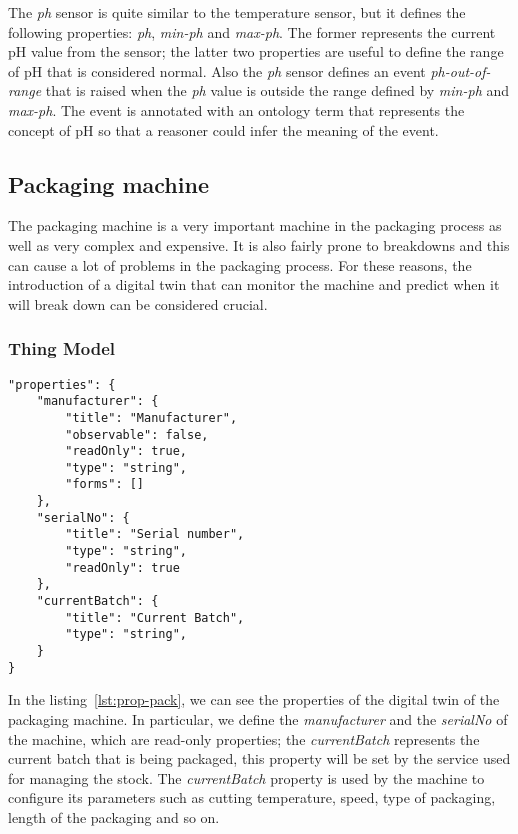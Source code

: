 The \textit{ph} sensor is quite similar to the temperature sensor, but it defines the following properties: \textit{ph}, \textit{min-ph} and \textit{max-ph}. The former represents the current pH value from the sensor; the latter two properties are useful to define the range of pH that is considered normal. Also the \textit{ph} sensor defines an event \textit{ph-out-of-range} that is raised when the \textit{ph} value is outside the range defined by \textit{min-ph} and \textit{max-ph}.
The event is annotated with an ontology term that represents the concept of pH so that a reasoner could infer the meaning of the event. 

\subsection{Packaging machine}
The packaging machine is a very important machine in the packaging process as well as very complex and expensive.
It is also fairly prone to breakdowns and this can cause a lot of problems in the packaging process.
For these reasons, the introduction of a digital twin that can monitor the machine and predict when it will break down can be considered crucial.


\subsubsection{Thing Model}

\begin{lstlisting}[caption={Properties of the packaging machine Thing Model.},label={lst:prop-pack}]
"properties": {
	"manufacturer": {
		"title": "Manufacturer",
		"observable": false,
		"readOnly": true,
		"type": "string",
		"forms": []
	},
	"serialNo": {
		"title": "Serial number",
		"type": "string",
		"readOnly": true
	},
	"currentBatch": {
		"title": "Current Batch",
		"type": "string",
	}
}
\end{lstlisting}

In the listing~\ref{lst:prop-pack}, we can see the properties of the digital twin of the packaging machine. In particular, we define the
\textit{manufacturer} and the \textit{serialNo} of the machine, which are read-only properties;
the \textit{currentBatch} represents the current batch that is being packaged, this property will be set by the service used for managing the stock.
The \textit{currentBatch} property is used by the machine to configure its parameters such as cutting temperature, speed, type of packaging, length
of the packaging and so on.

